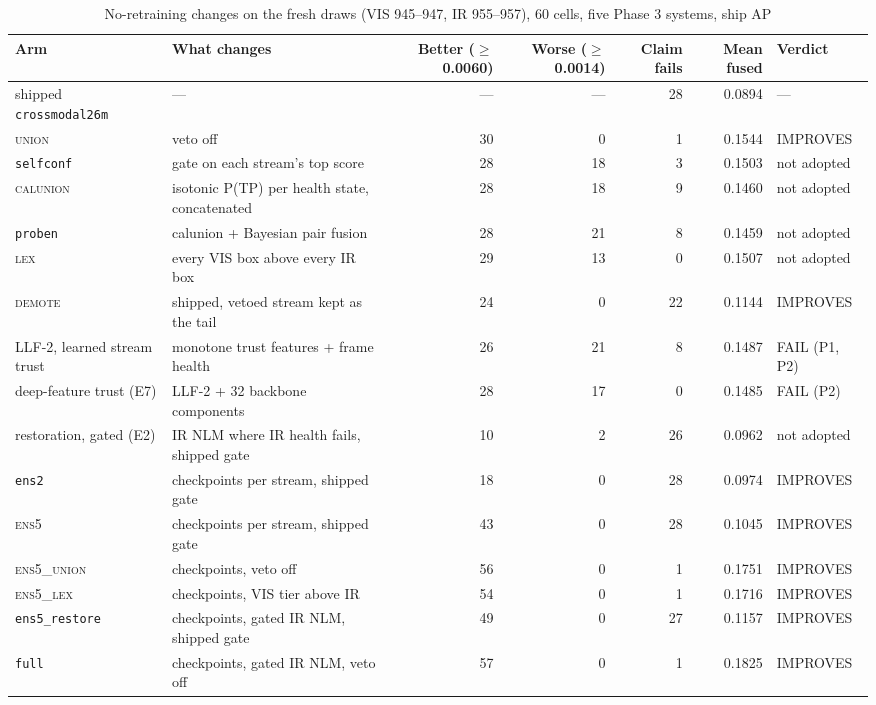 \documentclass[journal,onecolumn]{IEEEtran}
\begin{document}
\begin{table}[htbp]
\centering
\footnotesize
\caption{No-retraining changes on the fresh draws (VIS 945--947, IR 955--957), 60 cells, five Phase 3 systems, ship AP}
\label{tab:15}
\setlength{\tabcolsep}{3pt}
\begin{tabularx}{\linewidth}{l>{\raggedright\arraybackslash}Xrrrrl}
\toprule
Arm & What changes & Better ($\geq$0.0060) & Worse ($\geq$0.0014) & Claim fails & Mean fused & Verdict \\
\midrule
shipped \texttt{crossmodal26m} & --- & --- & --- & 28 & 0.0894 & --- \\
\textsc{union} & veto off & 30 & 0 & 1 & 0.1544 & IMPROVES \\
\texttt{selfconf} & gate on each stream's top score & 28 & 18 & 3 & 0.1503 & not adopted \\
\textsc{calunion} & isotonic P(TP) per health state, concatenated & 28 & 18 & 9 & 0.1460 & not adopted \\
\texttt{proben} & calunion + Bayesian pair fusion & 28 & 21 & 8 & 0.1459 & not adopted \\
\textsc{lex} & every VIS box above every IR box & 29 & 13 & 0 & 0.1507 & not adopted \\
\textsc{demote} & shipped, vetoed stream kept as the tail & 24 & 0 & 22 & 0.1144 & IMPROVES \\
LLF-2, learned stream trust & monotone trust features + frame health & 26 & 21 & 8 & 0.1487 & FAIL (P1, P2) \\
deep-feature trust (E7) & LLF-2 + 32 backbone components & 28 & 17 & 0 & 0.1485 & FAIL (P2) \\
restoration, gated (E2) & IR NLM where IR health fails, shipped gate & 10 & 2 & 26 & 0.0962 & not adopted \\
\texttt{ens2} & 2 checkpoints per stream, shipped gate & 18 & 0 & 28 & 0.0974 & IMPROVES \\
\textsc{ens5} & 5 checkpoints per stream, shipped gate & 43 & 0 & 28 & 0.1045 & IMPROVES \\
\textsc{ens5\_union} & 5 checkpoints, veto off & 56 & 0 & 1 & 0.1751 & IMPROVES \\
\textsc{ens5\_lex} & 5 checkpoints, VIS tier above IR & 54 & 0 & 1 & 0.1716 & IMPROVES \\
\texttt{ens5\_\allowbreak{}restore} & 5 checkpoints, gated IR NLM, shipped gate & 49 & 0 & 27 & 0.1157 & IMPROVES \\
\texttt{full} & 5 checkpoints, gated IR NLM, veto off & 57 & 0 & 1 & 0.1825 & IMPROVES \\

\end{tabularx}
\end{table}
\end{document}
